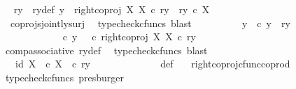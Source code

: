 \begin{isabellebody}
\ \isamarkupfalse%
\ ry\ \ ry{\isacharunderscore}{\kern0pt}def{\isacharcolon}{\kern0pt}\ {\isachardoublequoteopen}y\ {\isacharequal}{\kern0pt}\ right{\isacharunderscore}{\kern0pt}coproj\ X\ X\ {\isasymcirc}\isactrlsub c\ ry\ {\isasymand}\ ry\ {\isasymin}\isactrlsub c\ X{\isachardoublequoteclose}\isanewline
\ \ \ \ \ \ \ \ \ \ \isamarkupfalse%
\ \ coprojs{\isacharunderscore}{\kern0pt}jointly{\isacharunderscore}{\kern0pt}surj\ \isamarkupfalse%
\ {\isacharparenleft}{\kern0pt}typecheck{\isacharunderscore}{\kern0pt}cfuncs{\isacharcomma}{\kern0pt}\ blast{\isacharparenright}{\kern0pt}\isanewline
\ \ \ \ \ \ \ \ \isamarkupfalse%
\ {\isasymrho}y{\isacharcolon}{\kern0pt}\ {\isachardoublequoteopen}{\isasymrho}\ {\isasymcirc}\isactrlsub c\ y\ {\isacharequal}{\kern0pt}\ {\isasymlangle}ry{\isacharcomma}{\kern0pt}\ {\isasymf}{\isasymrangle}{\isachardoublequoteclose}\isanewline
\ \ \ \ \ \ \ \ \isamarkupfalse%
\ {\isacharminus}{\kern0pt}\ \isanewline
\ \ \ \ \ \ \ \ \ \ \isamarkupfalse%
\ {\isachardoublequoteopen}{\isasymrho}\ {\isasymcirc}\isactrlsub c\ y\ {\isacharequal}{\kern0pt}\ {\isacharparenleft}{\kern0pt}{\isasymrho}\ {\isasymcirc}\isactrlsub c\ right{\isacharunderscore}{\kern0pt}coproj\ X\ X{\isacharparenright}{\kern0pt}\ {\isasymcirc}\isactrlsub c\ ry{\isachardoublequoteclose}\isanewline
\ \ \ \ \ \ \ \ \ \ \ \ \isamarkupfalse%
\ comp{\isacharunderscore}{\kern0pt}associative{}\ ry{\isacharunderscore}{\kern0pt}def\ \isamarkupfalse%
\ {\isacharparenleft}{\kern0pt}typecheck{\isacharunderscore}{\kern0pt}cfuncs{\isacharcomma}{\kern0pt}\ blast{\isacharparenright}{\kern0pt}\isanewline
\ \ \ \ \ \ \ \ \ \ \isamarkupfalse%
\ \isamarkupfalse%
\ {\isachardoublequoteopen}{\isachardot}{\kern0pt}{\isachardot}{\kern0pt}{\isachardot}{\kern0pt}\ {\isacharequal}{\kern0pt}\ {\isasymlangle}id\ X{\isacharcomma}{\kern0pt}\ {\isasymf}\ {\isasymcirc}\isactrlsub c\ {\isasymbeta}\isactrlbsub X\isactrlesub {\isasymrangle}\ \ {\isasymcirc}\isactrlsub c\ ry{\isachardoublequoteclose}\isanewline
\ \ \ \ \ \ \ \ \ \ \ \ \isamarkupfalse%
\ {\isasymrho}{\isacharunderscore}{\kern0pt}def\ \ \isamarkupfalse%
\ right{\isacharunderscore}{\kern0pt}coproj{\isacharunderscore}{\kern0pt}cfunc{\isacharunderscore}{\kern0pt}coprod\ \isamarkupfalse%
\ {\isacharparenleft}{\kern0pt}typecheck{\isacharunderscore}{\kern0pt}cfuncs{\isacharcomma}{\kern0pt}\ presburger{\isacharparenright}{\kern0pt}\isanewline

\end{isabellebody}
